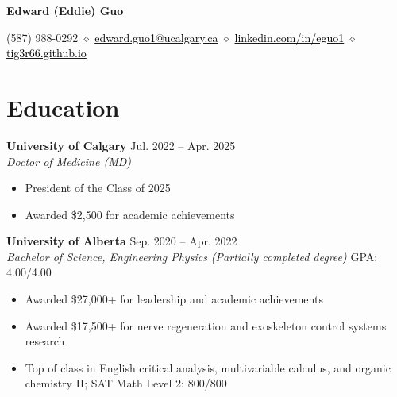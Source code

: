 \documentclass{article}
\begin{document}
\thispagestyle{plain}
\begin{center}
\LARGE \textbf{\textcolor{my_colour}{Edward (Eddie) Guo}} \vspace{.2em}

\normalfont \normalsize
(587) 988-0292
    \hspace{.15em} $\diamond$ \hspace{.15em}
\href{mailto:edward.guo1@ucalgary.ca}{\textcolor{black}{edward.guo1@ucalgary.ca}}
    \hspace{.15em} $\diamond$ \hspace{.15em}
\href{https://www.linkedin.com/in/eguo1}{\textcolor{black}{linkedin.com/in/eguo1}}
    \hspace{.15em} $\diamond$ \hspace{.15em}
\href{https://tig3r66.github.io/index.html}{\textcolor{black}{tig3r66.github.io}}
\end{center}

\vspace{-1em}


\section*{\textcolor{my_colour}{Education}}
\vspace{-.25em} \hrulefill \vspace{.25em}

\textbf{University of Calgary} \hfill Jul. 2022 -- Apr. 2025 \\
\textit{Doctor of Medicine (MD)}
\begin{itemize}
    \item President of the Class of 2025
    \item Awarded \$2,500 for academic achievements
\end{itemize} \vspace{1em}

\textbf{University of Alberta} \hfill Sep. 2020 -- Apr. 2022 \\
\textit{Bachelor of Science, Engineering Physics (Partially completed degree)} \hfill GPA: 4.00/4.00
\begin{itemize}
    \item Awarded \$27,000+ for leadership and academic achievements
    \item Awarded \$17,500+ for nerve regeneration and exoskeleton control systems research
    \item Top of class in English critical analysis, multivariable calculus, and organic chemistry II; SAT Math Level 2: 800/800
\end{itemize} \vspace{1em}
\end{document}

